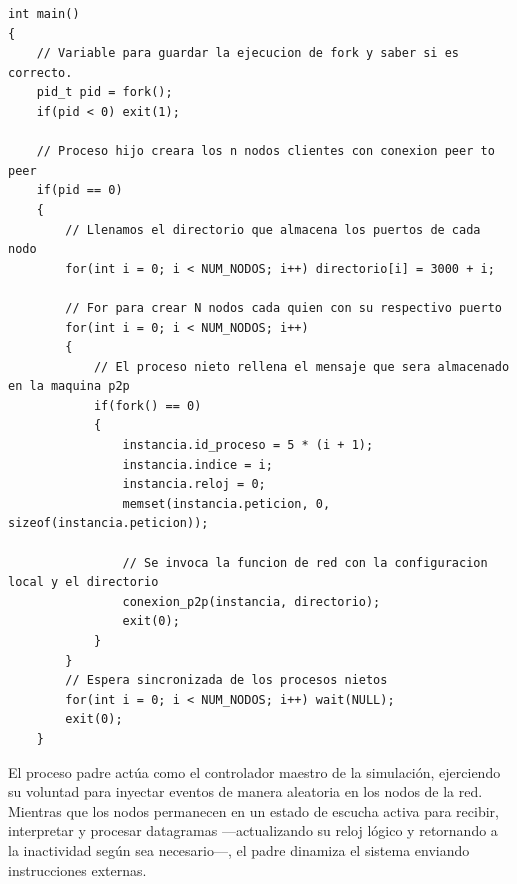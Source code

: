 \begin{lstlisting}[style=estiloC]
int main()
{
    // Variable para guardar la ejecucion de fork y saber si es correcto.
    pid_t pid = fork();
    if(pid < 0) exit(1);

    // Proceso hijo creara los n nodos clientes con conexion peer to peer
    if(pid == 0)
    {
        // Llenamos el directorio que almacena los puertos de cada nodo
        for(int i = 0; i < NUM_NODOS; i++) directorio[i] = 3000 + i;

        // For para crear N nodos cada quien con su respectivo puerto
        for(int i = 0; i < NUM_NODOS; i++)
        {
            // El proceso nieto rellena el mensaje que sera almacenado en la maquina p2p
            if(fork() == 0)
            {
                instancia.id_proceso = 5 * (i + 1);
                instancia.indice = i;
                instancia.reloj = 0;
                memset(instancia.peticion, 0, sizeof(instancia.peticion));
                
                // Se invoca la funcion de red con la configuracion local y el directorio
                conexion_p2p(instancia, directorio);
                exit(0);
            }
        }
        // Espera sincronizada de los procesos nietos
        for(int i = 0; i < NUM_NODOS; i++) wait(NULL);
        exit(0);
    }
\end{lstlisting}

El proceso padre actúa como el controlador maestro de la simulación, ejerciendo su voluntad para inyectar eventos de manera aleatoria en los nodos de la red. Mientras que los nodos permanecen en un estado de escucha activa para recibir, interpretar y procesar datagramas —actualizando su reloj lógico y retornando a la inactividad según sea necesario—, el padre dinamiza el sistema enviando instrucciones externas.

